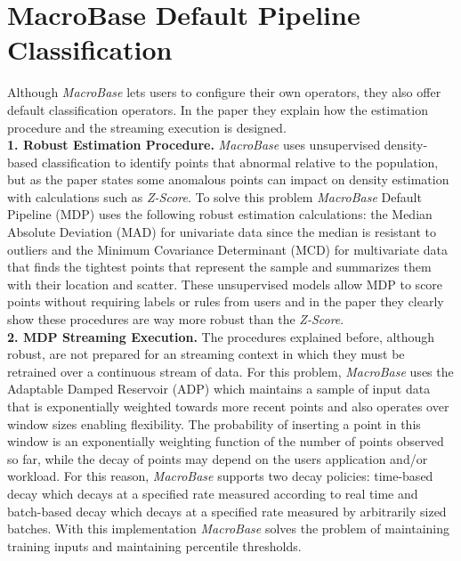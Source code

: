 \documentclass[11pt, titlepage]{article}
\begin{document}
	\section{MacroBase Default Pipeline Classification}
		Although \textit{MacroBase} lets users to configure their own operators, they also offer default classification operators. In the paper they explain how the estimation procedure and the streaming execution is designed.
		\\\textbf{1. Robust Estimation Procedure.} \textit{MacroBase} uses unsupervised density-based classification to identify points that abnormal relative to the population, but as the paper states some anomalous points can impact on density estimation with calculations such as \textit{Z-Score}. To solve this problem \textit{MacroBase} Default Pipeline (MDP) uses the following robust estimation calculations: the Median Absolute Deviation (MAD) for univariate data since the median is resistant to outliers and the Minimum Covariance Determinant (MCD) for multivariate data that finds the tightest points that represent the sample and summarizes them with their location and scatter. These unsupervised models allow MDP to score points without requiring labels or rules from users and in the paper they clearly show these procedures are way more robust than the \textit{Z-Score}.
		\\\textbf{2. MDP Streaming Execution.} The procedures explained before, although robust, are not prepared for an streaming context in which they must be retrained over a continuous stream of data. For this problem, \textit{MacroBase} uses the Adaptable Damped Reservoir (ADP) which maintains a sample of input data that is exponentially weighted towards more recent points and also operates over window sizes enabling flexibility. The probability of inserting a point in this window is an exponentially weighting function of the number of points observed so far, while the decay of points may depend on the users application and/or workload. For this reason, \textit{MacroBase} supports two decay policies: time-based decay which decays at a specified rate measured according to real time and batch-based decay which decays at a specified rate measured by arbitrarily sized batches. With this implementation \textit{MacroBase} solves the problem of maintaining training inputs and maintaining percentile thresholds.
\end{document}
